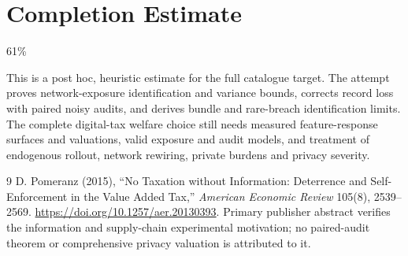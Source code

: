\documentclass[11pt,a4paper]{article}
\theoremstyle{definition}
\theoremstyle{remark}
\begin{document}
\section{Completion Estimate}
61\%

This is a post hoc, heuristic estimate for the full catalogue target.
The attempt proves network-exposure identification and variance bounds, corrects record loss with paired noisy audits, and derives bundle and rare-breach identification limits. The complete digital-tax welfare choice still needs measured feature-response surfaces and valuations, valid exposure and audit models, and treatment of endogenous rollout, network rewiring, private burdens and privacy severity.

\begin{thebibliography}{9}
 D. Pomeranz (2015), ``No Taxation without Information: Deterrence and Self-Enforcement in the Value Added Tax,'' \emph{American Economic Review} 105(8), 2539--2569. \url{https://doi.org/10.1257/aer.20130393}. Primary publisher abstract verifies the information and supply-chain experimental motivation; no paired-audit theorem or comprehensive privacy valuation is attributed to it.
\end{thebibliography}
\end{document}
